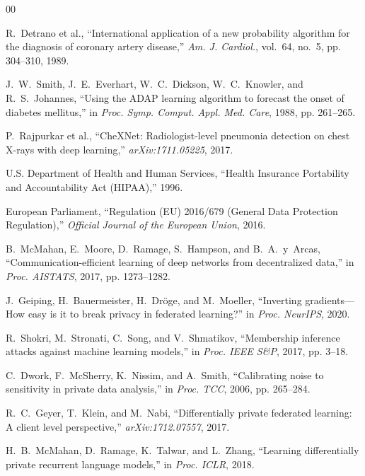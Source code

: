\documentclass[journal]{IEEEtran}
\begin{document}

\begin{thebibliography}{00}

R.~Detrano et al.,
``International application of a new probability algorithm for the diagnosis
of coronary artery disease,''
\textit{Am. J. Cardiol.}, vol.~64, no.~5, pp. 304--310, 1989.

J.~W.~Smith, J.~E.~Everhart, W.~C.~Dickson, W.~C.~Knowler, and R.~S.~Johannes,
``Using the ADAP learning algorithm to forecast the onset of diabetes mellitus,''
in \textit{Proc. Symp. Comput. Appl. Med. Care}, 1988, pp. 261--265.

P.~Rajpurkar et al.,
``CheXNet: Radiologist-level pneumonia detection on chest X-rays with deep
learning,''
\textit{arXiv:1711.05225}, 2017.

U.S. Department of Health and Human Services,
``Health Insurance Portability and Accountability Act (HIPAA),'' 1996.

European Parliament,
``Regulation (EU) 2016/679 (General Data Protection Regulation),''
\textit{Official Journal of the European Union}, 2016.

B.~McMahan, E.~Moore, D.~Ramage, S.~Hampson, and B.~A.~y~Arcas,
``Communication-efficient learning of deep networks from decentralized data,''
in \textit{Proc. AISTATS}, 2017, pp. 1273--1282.

J.~Geiping, H.~Bauermeister, H.~Dr\"{o}ge, and M.~Moeller,
``Inverting gradients---How easy is it to break privacy in federated learning?''
in \textit{Proc. NeurIPS}, 2020.

R.~Shokri, M.~Stronati, C.~Song, and V.~Shmatikov,
``Membership inference attacks against machine learning models,''
in \textit{Proc. IEEE S\&P}, 2017, pp. 3--18.

C.~Dwork, F.~McSherry, K.~Nissim, and A.~Smith,
``Calibrating noise to sensitivity in private data analysis,''
in \textit{Proc. TCC}, 2006, pp. 265--284.

R.~C.~Geyer, T.~Klein, and M.~Nabi,
``Differentially private federated learning: A client level perspective,''
\textit{arXiv:1712.07557}, 2017.

H.~B.~McMahan, D.~Ramage, K.~Talwar, and L.~Zhang,
``Learning differentially private recurrent language models,''
in \textit{Proc. ICLR}, 2018.


\end{thebibliography}
\end{document}
